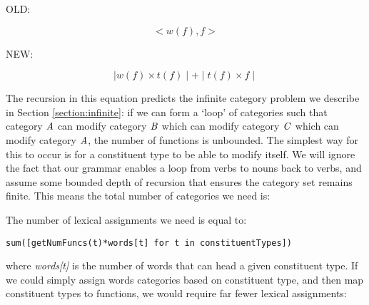 \documentclass[11pt,twoside,final]{ahudson-harvard}
\newcommand{\cf}[1]{\mbox{$\it{#1}$}}   %
\begin{document}

OLD:

\begin{equation}
<w(f), f>
\end{equation}

NEW:

\begin{equation}
\mid w(f) \times t(f) \mid + \mid t(f) \times f \mid
\end{equation}


The recursion in this equation predicts the infinite category problem we describe in Section \ref{section:infinite}: if we can form a `loop' of categories such that category \cf{A} can modify category \cf{B} which can modify category \cf{C} which can modify category \cf{A}, the number of functions is unbounded. The simplest way for this to occur is for a constituent type to be able to modify itself. We will ignore the fact that our grammar enables a loop from verbs to nouns back to verbs, and assume some bounded depth of recursion that ensures the category set remains finite. This means the total number of categories we need is:




The number of lexical assignments we need is equal to:

\begin{verbatim}
sum([getNumFuncs(t)*words[t] for t in constituentTypes])
\end{verbatim}

where \emph{words[t]} is the number of words that can head a given constituent type. If we could simply assign words categories based on constituent type, and then map constituent types to functions, we would require far fewer lexical assignments:
\end{document}
